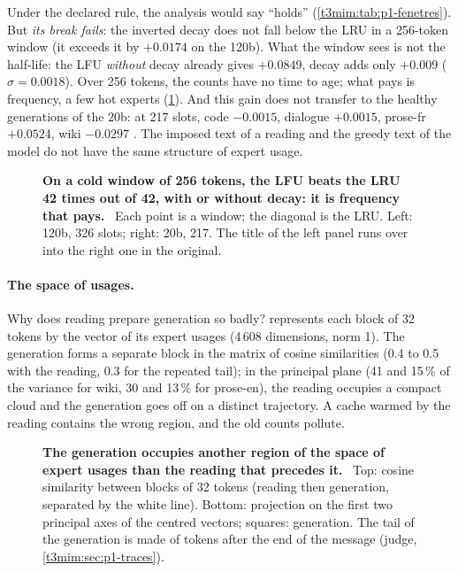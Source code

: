 Under the declared rule, the analysis would say ``holds'' (\cref{t3mim:tab:p1-fenetres}). But \emph{its break fails}: the inverted decay does not fall below the LRU in a 256-token window (it exceeds it by $+0.0174$ on the 120b). What the window sees is not the half-life: the LFU \emph{without} decay already gives $+0.0849$, decay adds only $+0.009$ ($\sigma = 0.0018$). Over 256 tokens, the counts have no time to age; what pays is frequency, a few hot experts (\cref{fig:t3-mim-p1-froides}). And this gain does not transfer to the healthy generations of the 20b: at 217 slots, code $-0.0015$, dialogue $+0.0015$, prose-fr $+0.0524$, wiki $-0.0297$ \mes. The imposed text of a reading and the greedy text of the model do not have the same structure of expert usage.

\begin{figure}[tbp]
\centering
{}
\caption[P1: cold windows, hit rate of the LRU against the policy]{\textbf{On a cold window of 256 tokens, the LFU beats the LRU 42 times out of 42, with or without decay: it is frequency that pays.} \mes~Each point is a window; the diagonal is the LRU. Left: 120b, 326 slots; right: 20b, 217. The title of the left panel runs over into the right one in the original. \HorsStyle{}}
\label{fig:t3-mim-p1-froides}
\end{figure}

\paragraph{The space of usages.} Why does reading prepare generation so badly?  represents each block of 32 tokens by the vector of its expert usages (4\,608 dimensions, norm 1). The generation forms a separate block in the matrix of cosine similarities (0.4 to 0.5 with the reading, 0.3 for the repeated tail); in the principal plane (41 and 15\,\% of the variance for wiki, 30 and 13\,\% for prose-en), the reading occupies a compact cloud and the generation goes off on a distinct trajectory. A cache warmed by the reading contains the wrong region, and the old counts pollute.

\begin{figure}[tbp]
\centering
{}
\caption[P1: the latent space of the blocks of expert usages]{\textbf{The generation occupies another region of the space of expert usages than the reading that precedes it.} \mes~Top: cosine similarity between blocks of 32 tokens (reading then generation, separated by the white line). Bottom: projection on the first two principal axes of the centred vectors; squares: generation. The tail of the generation is made of tokens after the end of the message (judge, \cref{t3mim:sec:p1-traces}). \HorsStyle{}}
\label{fig:t3-mim-p1-topologie}
\end{figure}

